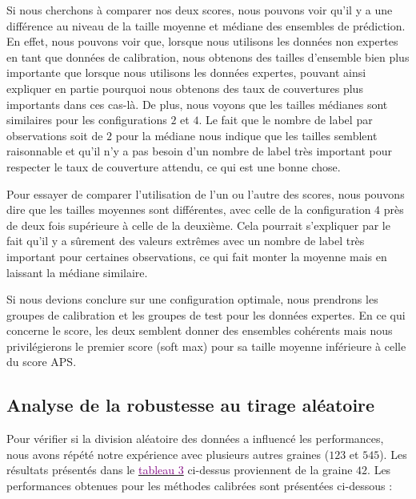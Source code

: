 \documentclass[a4paper,12pt]{article}
\begin{document}
\vspace{0.2cm}

Si nous cherchons à comparer nos deux scores, nous pouvons voir qu'il y a une différence au niveau de la taille moyenne et médiane des ensembles de prédiction. En effet, nous pouvons voir que, lorsque nous utilisons les données non expertes en tant que données de calibration, nous obtenons des tailles d'ensemble bien plus importante que lorsque nous utilisons les données expertes, pouvant ainsi expliquer en partie pourquoi nous obtenons des taux de couvertures plus importants dans ces cas-là. De plus, nous voyons que les tailles médianes sont similaires pour les configurations $2$ et $4$. Le fait que le nombre de label par observations soit de $2$ pour la médiane nous indique que les tailles semblent raisonnable et qu'il n'y a pas besoin d'un nombre de label très important pour respecter le taux de couverture attendu, ce qui est une bonne chose.

\vspace{0.2cm}

Pour essayer de comparer l'utilisation de l'un ou l'autre des scores, nous pouvons dire que les tailles moyennes sont différentes, avec celle de la configuration $4$ près de deux fois supérieure à celle de la deuxième. Cela pourrait s'expliquer par le fait qu'il y a sûrement des valeurs extrêmes avec un nombre de label très important pour certaines observations, ce qui fait monter la moyenne mais en laissant la médiane similaire.

\vspace{0.2cm}

Si nous devions conclure sur une configuration optimale, nous prendrons les groupes de calibration et les groupes de test pour les données expertes. En ce qui concerne le score, les deux semblent donner des ensembles cohérents mais nous privilégierons le premier score (soft max) pour sa taille moyenne inférieure à celle du score APS.


\subsection{Analyse de la robustesse au tirage aléatoire}

Pour vérifier si la division aléatoire des données a influencé les performances, nous avons répété notre expérience avec plusieurs autres graines ($123$ et $545$). Les résultats présentés dans le \hyperref[tab3]{\textcolor{purple}{tableau 3}} ci-dessus proviennent de la graine $42$. Les performances obtenues pour les méthodes calibrées sont présentées ci-dessous :
\end{document}

